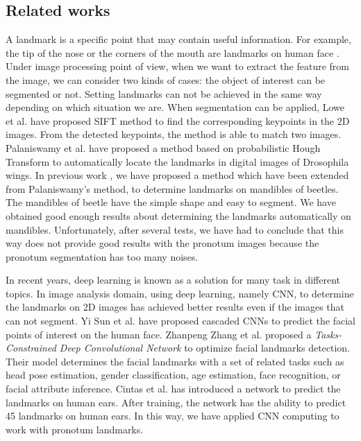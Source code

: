 \documentclass{article} %
\begin{document}
\begin{multicols}{2}
\section{Related works}
A landmark is a specific point that may contain useful information. For example, the tip of the nose or the corners of the mouth are landmarks on human face \cite{sun2013deep}. Under image processing point of view, when we want to extract the feature from the image, we can consider two kinds of cases: the object of interest can be segmented or not. Setting landmarks can not be achieved in the same way depending on which situation we are. When segmentation can be applied, Lowe et al. \cite{lowe2004distinctive} have proposed SIFT method to find the corresponding keypoints in the 2D images. From the detected keypoints, the method is able to match two images. Palaniswamy et al. \cite{palaniswamy2010automatic} have proposed a method based on probabilistic Hough Transform to automatically locate the landmarks in digital images of Drosophila wings. In previous work \cite{le2017maelab}, we have proposed a method which have been extended from Palaniswamy's method, to determine landmarks on mandibles of beetles. The mandibles of beetle have the simple shape and easy to segment. We have obtained good enough results about determining the landmarks automatically on mandibles. Unfortunately, after several tests, we have had to conclude that this way does not provide good results with the pronotum images because the pronotum segmentation has too many noises.

In recent years, deep learning is known as a solution for many task in different topics. In image analysis domain, using deep learning, namely CNN, to determine the landmarks on 2D images has achieved better results even if the images that can not segment. Yi Sun et al. \cite{sun2013deep} have proposed cascaded CNNs to predict the facial points of interest on the human face.
Zhanpeng Zhang et al. \cite{zhang2014facial} proposed a \textit{Tasks-Constrained Deep Convolutional Network} to optimize facial landmarks detection. Their model determines the facial landmarks with a set of related tasks such as head pose estimation, gender classification, age estimation, face recognition, or facial attribute inference. Cintas et al. \cite{cintas2016automatic} has introduced a network to predict the landmarks on human ears. After training, the network has the ability to predict 45 landmarks on human ears. In this way, we have applied CNN computing to work with pronotum landmarks.


\end{multicols}
\end{document}
